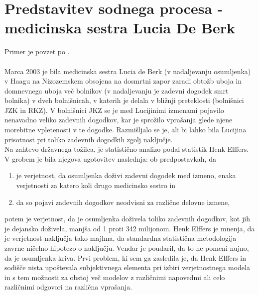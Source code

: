 \documentclass[fin1, tisk]{fmfdelo}
\theoremstyle{definition}
\theoremstyle{trditev}
\theoremstyle{izrek}
\begin{document}
\section{Predstavitev sodnega procesa - medicinska sestra Lucia De Berk}
Primer je povzet po \cite{collins}.\\\\
Marca 2003 je bila medicinska sestra Lucia de Berk (v nadaljevanju osumljenka) v Haagu na Nizozemskem obsojena na dosmrtni zapor zaradi obtožb 
uboja in domnevnega uboja več bolnikov (v nadaljevanju je zadevni dogodek smrt bolnika) v dveh bolnišnicah, v katerih je delala v bližnji preteklosti (bolnišnici JZK in RKZ). V bolnišnici JKZ 
se je med Lucijinimi izmenami pojavilo nenavadno veliko zadevnih dogodkov, kar je sprožilo vprašanja glede njene morebitne vpletenosti v te dogodke. 
Razmišljalo se je, ali bi lahko bila Lucijina prisotnost pri toliko zadevnih dogodkih zgolj naključje.\\
Na zahtevo državnega tožilca, je statistično analizo podal statistik Henk Elffers. V grobem je bila njegova ugotovitev naslednja: ob predpostavkah, da
\begin{enumerate}
    \item je verjetnost, da osumljenka doživi zadevni dogodek med izmeno, enaka verjetnosti za katero koli drugo medicinsko sestro in
    \item da so pojavi zadevnih dogodkov neodvisni za različne delovne izmene,
\end{enumerate}
potem je verjetnost, da je osumljenka doživela toliko zadevnih dogodkov, kot jih je dejansko doživela, manjša od 1 proti 342 milijonom. Henk Elffers je mnenja, 
da je verjetnost naključja tako majhna, da standardna statistična metodologija zavrne ničelno hipotezo o naključju. Vendar je poudaril, da 
to ne pomeni nujno, da je osumljenka kriva. Prvi problem, ki sem ga zasledila je, da Henk Elffers in sodišče nista upoštevala subjektivnega 
elementa pri izbiri verjetnostnega modela in s tem možnosti za obstoj več modelov z različnimi napovedmi ali celo različnimi odgovori 
na različna vprašanja. 

\end{document}
